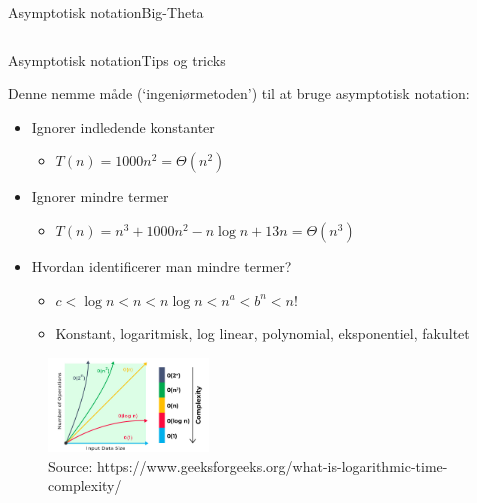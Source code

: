 \documentclass[aspectratio=1610]{beamer}
\begin{document}
\begin{frame}{Asymptotisk notation}{Big-Theta}
\begin{columns}
    \end{columns}
\end{frame}

\begin{frame}{Asymptotisk notation}{Tips og tricks}

    Denne nemme måde (`ingeniørmetoden') til at bruge asymptotisk notation:
    \pause
    \begin{itemize}[<+->]
        \item Ignorer indledende konstanter
            \begin{itemize}
                \item $T(n) = 1000n^2 = \Theta(n^2)$
            \end{itemize}
        \item Ignorer mindre termer
            \begin{itemize}
                \item $T(n) = n^3 + 1000n^2 - n \log n + 13n = \Theta(n^3)$
            \end{itemize}
        \item Hvordan identificerer man mindre termer?
            \begin{itemize}
                \item $c < \log n < n < n \log n < n^a < b^n < n!~$
                \item Konstant, logaritmisk, log linear, polynomial,
                    eksponentiel, fakultet
            \end{itemize}
    \end{itemize}

    \pause
    \begin{figure}[h]
        \centering
        \includegraphics[width=0.38\textwidth]{time-complexity}
        \caption{Source: https://www.geeksforgeeks.org/what-is-logarithmic-time-complexity/}
        \label{fig:time-complexity}
    \end{figure}
\end{frame}
\end{document}
